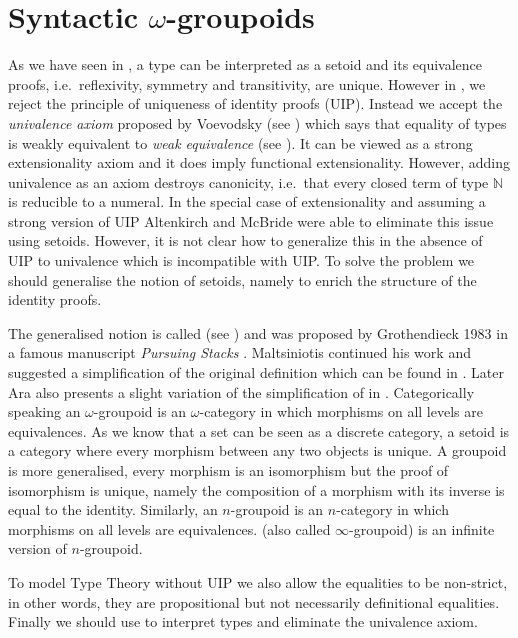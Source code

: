 \chapter{Syntactic $\omega$-groupoids}
\label{wog}


As we have seen in , a type can be interpreted as a setoid and its equivalence proofs, i.e.\  reflexivity, symmetry and transitivity, are unique. 
However in \hott, we reject the principle of uniqueness of identity proofs (UIP). 
Instead we accept the \emph{univalence axiom} proposed by Voevodsky (see ) which says that equality of types is weakly equivalent to \emph{weak equivalence} (see ). 
It can be viewed as a strong extensionality axiom and it does imply functional extensionality. However, adding
univalence as an axiom destroys canonicity, i.e.\ that every closed
term of type $\mathbb{N}$ is reducible to a numeral. In the special
case of extensionality and assuming a strong version of UIP Altenkirch and McBride were able to eliminate this issue
\cite{alti:lics99,alti:ott-conf} using setoids. However, it is not
clear how to generalize this in the absence of UIP to univalence which
is incompatible with UIP. To solve the problem we should generalise
the notion of setoids, namely to enrich the structure of the identity
proofs.


The generalised notion is called \emph{\wogs} (see ) and was proposed by
Grothendieck 1983 in a famous manuscript \emph{Pursuing Stacks} \cite{gro:ps}. Maltsiniotis continued his work and suggested a simplification of the original definition which can be found in \cite{mal:gwog}. Later Ara also presents a slight variation of the simplification of {\wog} in \cite{ara:wog}. Categorically speaking an $\omega$-groupoid is an $\omega$-category in which morphisms on all levels are equivalences. As we know that a set can be seen as a discrete
category, a setoid is a category where every morphism between
any two objects is unique. A groupoid is more generalised, every morphism is
an isomorphism but the proof of isomorphism is unique, namely the
composition of a morphism with its inverse is equal to the identity. Similarly, an
$n$-groupoid is an $n$-category in which morphisms on all levels are
equivalences. {\wogs} (also called $\infty$-groupoid) is an
infinite version of $n$-groupoid. 


 To model Type Theory without UIP we
also allow the equalities to be non-strict, in other words, they are
propositional but not necessarily definitional equalities. Finally we should use {\wog} to interpret types and eliminate the univalence axiom.


